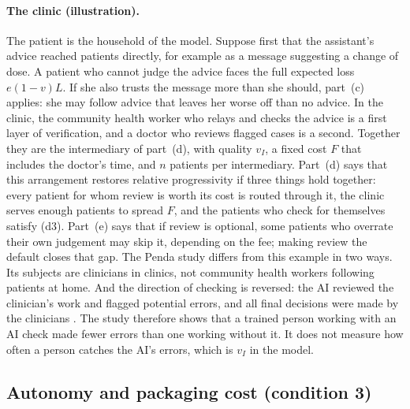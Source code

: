 \documentclass[12pt]{article}
\theoremstyle{remark}
\begin{document}
\paragraph{The clinic (illustration).} The patient is the household of the model. Suppose first that the assistant's advice reached patients directly, for example as a message suggesting a change of dose. A patient who cannot judge the advice faces the full expected loss $e(1-v)L$. If she also trusts the message more than she should, part~(c) applies: she may follow advice that leaves her worse off than no advice. In the clinic, the community health worker who relays and checks the advice is a first layer of verification, and a doctor who reviews flagged cases is a second. Together they are the intermediary of part~(d), with quality $v_I$, a fixed cost $F$ that includes the doctor's time, and $n$ patients per intermediary. Part~(d) says that this arrangement restores relative progressivity if three things hold together: every patient for whom review is worth its cost is routed through it, the clinic serves enough patients to spread $F$, and the patients who check for themselves satisfy (d3). Part~(e) says that if review is optional, some patients who overrate their own judgement may skip it, depending on the fee; making review the default closes that gap. The Penda study differs from this example in two ways. Its subjects are clinicians in clinics, not community health workers following patients at home. And the direction of checking is reversed: the AI reviewed the clinician's work and flagged potential errors, and all final decisions were made by the clinicians \citep[pp.~5, 7]{korom2025penda}. The study therefore shows that a trained person working with an AI check made fewer errors than one working without it. It does not measure how often a person catches the AI's errors, which is $v_I$ in the model.

\subsection{Autonomy and packaging cost (condition 3)}\label{sec:autonomy}
\end{document}
